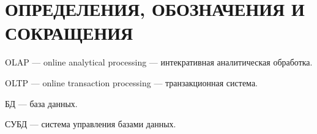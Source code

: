\section*{ОПРЕДЕЛЕНИЯ, ОБОЗНАЧЕНИЯ И СОКРАЩЕНИЯ}

OLAP --- online analytical processing --- интекративная аналитическая обработка.

OLTP --- online transaction processing --- транзакционная система.

БД --- база данных.

СУБД --- система управления базами данных.

\pagebreak